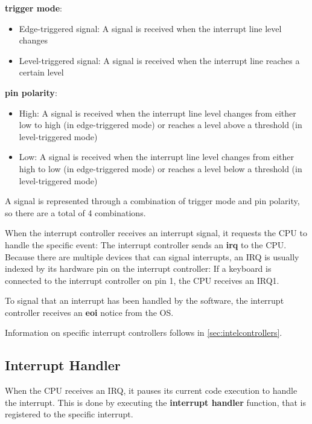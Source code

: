 \textbf{\Gls{trigger mode}}:

\begin{itemize}
  \item Edge-triggered signal: A signal is received when the interrupt line level changes
  \item Level-triggered signal: A signal is received when the interrupt line reaches a certain level
\end{itemize}

\textbf{\Gls{pin polarity}}:

\begin{itemize}
  \item High: A signal is received when the interrupt line level changes from either low to high (in
        edge-triggered mode) or reaches a level above a threshold (in level-triggered mode)
  \item Low: A signal is received when the interrupt line level changes from either high to low (in
        edge-triggered mode) or reaches a level below a threshold (in level-triggered mode)
\end{itemize}

A signal is represented through a combination of trigger mode and pin polarity, so there are a
total of 4 combinations.

When the interrupt controller receives an interrupt signal, it requests the CPU to handle the
specific event: The interrupt controller sends an \textbf{\gls{irq}} to the CPU. Because there are
multiple devices that can signal interrupts, an IRQ is usually indexed by its hardware pin on the
interrupt controller: If a keyboard is connected to the interrupt controller on pin 1, the CPU
receives an IRQ1.

To signal that an interrupt has been handled by the software, the interrupt controller receives an
\textbf{\gls{eoi}} notice from the OS\@.

Information on specific interrupt controllers follows in \autoref{sec:intelcontrollers}.

\subsection{Interrupt Handler}
\label{subsec:handler}

When the CPU receives an IRQ, it pauses its current code execution to handle the interrupt. This is
done by executing the \textbf{\gls{interrupt handler}} function, that is registered to the specific
interrupt.

